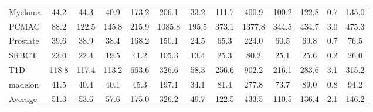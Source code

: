 \begin{table}[!t]
{\begin{tabular}{lcccccccccccc}
Myeloma          & 44.2 & 44.3 & 40.9 & 173.2 & 206.1 & 33.2 & 111.7 & 400.9 & 100.2 & 122.8 & 0.7 & 135.0 \\
PCMAC            & 88.2 & 122.5 & 145.8 & 215.9 & 1085.8 & 195.5 & 373.1 & 1377.8 & 344.5 & 434.7 & 3.0 & 475.3 \\
Prostate         & 39.6 & 38.9 & 38.4 & 168.2 & 150.1 & 24.5 & 65.3 & 224.0 & 60.5 & 69.8 & 0.7 & 76.5 \\
SRBCT            & 23.0 & 22.4 & 19.5 & 41.2 & 105.3 & 13.4 & 25.3 & 80.2 & 25.1 & 25.6 & 0.2 & 26.0 \\
T1D              & 118.8 & 117.4 & 113.2 & 663.6 & 326.6 & 58.3 & 256.6 & 902.2 & 216.1 & 283.6 & 3.1 & 315.2 \\
madelon          & 41.5 & 40.4 & 40.1 & 45.3 & 197.1 & 34.1 & 81.4 & 277.8 & 73.7 & 89.0 & 0.8 & 94.2 \\
\midrule
Average          & 51.3 & 53.6 & 57.6 & 175.0 & 326.2 & 49.7 & 122.5 & 433.5 & 110.5 & 136.4 & 2.1 & 146.2 \\
\bottomrule
\end{tabular}%
}
\end{table}